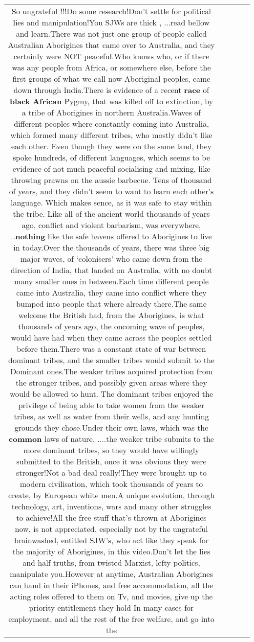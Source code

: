 \documentclass[11pt]{article}
\newlength\mylength
\begin{document}
\begin{center}
\begin{longtable}{|C{.65\mylength}|C{.30\mylength}|C{.12\mylength}|C{.12\mylength}|C{.12\mylength}|}
  \small So ungrateful !!!Do some research!Don't settle for political lies and manipulation!You SJWs are thick , ...read bellow and learn.There was not just one group of people called Australian Aborigines that came over to Australia, and they certainly were NOT peaceful.Who knows who, or if there was any people from Africa, or somewhere else, before the first groups of what we call now Aboriginal peoples, came down through India.There is evidence of a recent \textbf{race} of \textbf{black} \textbf{African} Pygmy, that was killed off to extinction, by a tribe of Aborigines in northern Australia.Waves of different peoples where constantly coming into Australia, which formed many different tribes, who mostly didn't like each other. Even though they were on the same land, they spoke hundreds, of different languages, which seems to be evidence of not much peaceful socialising and mixing, like throwing prawns on the aussie barbecue. Tens of thousand of years, and they didn't seem to want to learn each other's language. Which makes sence, as it was safe to stay within the tribe. Like all of the ancient world thousands of years ago, conflict and violent barbarism, was everywhere, ..\textbf{nothing} like the safe havens offered to Aborigines to live in today.Over the thousands of years, there was three big major waves, of ‘colonisers' who came down from the direction of India, that landed on Australia, with no doubt many smaller ones in between.Each time different people came into Australia, they came into conflict where they bumped into people that where already there.The same welcome the British had, from the Aborigines, is what thousands of years ago, the oncoming wave of peoples, would have had when they came across the peoples settled before them.There was a constant state of war between dominant tribes, and the smaller tribes would submit to the Dominant ones.The weaker tribes acquired protection from the stronger tribes, and possibly given areas where they would be allowed to hunt. The dominant tribes enjoyed the privilege of being able to take women from the weaker tribes, as well as water from their wells, and any hunting grounds they chose.Under their own laws, which was the \textbf{common} laws of nature, ....the weaker tribe submits to the more dominant tribes, so they would have willingly submitted to the British, once it was obvious they were stronger!Not a bad deal really!They were brought up to modern civilisation, which took thousands of years to create, by European white men.A unique evolution, through technology, art, inventions, wars and many other struggles to achieve!All the free stuff that's thrown at Aborigines now, is not appreciated, especially not by the ungrateful brainwashed, entitled SJW's, who act like they speak for the majority of Aborigines, in this video.Don't let the lies and half truths, from twisted Marxist, lefty politics, manipulate you.However at anytime, Australian Aborigines can hand in their iPhones, and free accommodation, all the acting roles offered to them on Tv, and movies, give up the priority entitlement they hold In many cases for employment, and all the rest of the free welfare, and go into the 
\end{longtable}
\end{center}
\end{document}
